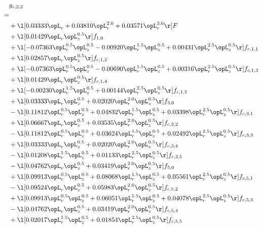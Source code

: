 \begin{alignat}{2} 
\label{eq:g_22_0} 
& g_{c,2,2} \nonumber \\ 
 = \\ 
& + \l[  0.03333 \opL_r +  0.03810 \opL_r^{2.0} +  0.03571 \opL_r^{3.0}  \r] F \nonumber \\ 
& + \l[  0.01429 \opL_r \opL_z^{0.5}  \r] f_{1,0} \nonumber \\ 
& + \l[  -0.07363 \opL_r^{0.5} \opL_z^{0.5}   -0.00920 \opL_r^{1.5} \opL_z^{0.5} +  0.00431 \opL_r^{2.5} \opL_z^{0.5}  \r] f_{c,1,1} \nonumber \\ 
& + \l[  0.02857 \opL_r \opL_z^{0.5}  \r] f_{c,1,2} \nonumber \\ 
& + \l[  -0.07363 \opL_r^{0.5} \opL_z^{0.5}   -0.00690 \opL_r^{1.5} \opL_z^{0.5} +  0.00316 \opL_r^{2.5} \opL_z^{0.5}  \r] f_{c,1,3} \nonumber \\ 
& + \l[  0.01429 \opL_r \opL_z^{0.5}  \r] f_{c,1,4} \nonumber \\ 
& + \l[  -0.00230 \opL_r^{1.5} \opL_z^{0.5} +  0.00144 \opL_r^{2.5} \opL_z^{0.5}  \r] f_{c,1,5} \nonumber \\ 
& + \l[  0.03333 \opL_r \opL_z^{0.5} +  0.02020 \opL_r^{2.0} \opL_z^{0.5}  \r] f_{3,0} \nonumber \\ 
& - \l[  0.11812 \opL_r^{0.5} \opL_z^{0.5} +  0.04832 \opL_r^{1.5} \opL_z^{0.5} +  0.03398 \opL_r^{2.5} \opL_z^{0.5}  \r] f_{c,3,1} \nonumber \\ 
& + \l[  0.06667 \opL_r \opL_z^{0.5} +  0.03535 \opL_r^{2.0} \opL_z^{0.5}  \r] f_{c,3,2} \nonumber \\ 
& - \l[  0.11812 \opL_r^{0.5} \opL_z^{0.5} +  0.03624 \opL_r^{1.5} \opL_z^{0.5} +  0.02492 \opL_r^{2.5} \opL_z^{0.5}  \r] f_{c,3,3} \nonumber \\ 
& + \l[  0.03333 \opL_r \opL_z^{0.5} +  0.02020 \opL_r^{2.0} \opL_z^{0.5}  \r] f_{c,3,4} \nonumber \\ 
& - \l[  0.01208 \opL_r^{1.5} \opL_z^{0.5} +  0.01133 \opL_r^{2.5} \opL_z^{0.5}  \r] f_{c,3,5} \nonumber \\ 
& - \l[  0.04762 \opL_r \opL_z^{0.5} +  0.03419 \opL_r^{2.0} \opL_z^{0.5}  \r] f_{5,0} \nonumber \\ 
& + \l[  0.09913 \opL_r^{0.5} \opL_z^{0.5} +  0.08068 \opL_r^{1.5} \opL_z^{0.5} +  0.05561 \opL_r^{2.5} \opL_z^{0.5}  \r] f_{c,5,1} \nonumber \\ 
& - \l[  0.09524 \opL_r \opL_z^{0.5} +  0.05983 \opL_r^{2.0} \opL_z^{0.5}  \r] f_{c,5,2} \nonumber \\ 
& + \l[  0.09913 \opL_r^{0.5} \opL_z^{0.5} +  0.06051 \opL_r^{1.5} \opL_z^{0.5} +  0.04078 \opL_r^{2.5} \opL_z^{0.5}  \r] f_{c,5,3} \nonumber \\ 
& - \l[  0.04762 \opL_r \opL_z^{0.5} +  0.03419 \opL_r^{2.0} \opL_z^{0.5}  \r] f_{c,5,4} \nonumber \\ 
& + \l[  0.02017 \opL_r^{1.5} \opL_z^{0.5} +  0.01854 \opL_r^{2.5} \opL_z^{0.5}  \r] f_{c,5,5} \nonumber \\ 
\end{alignat} 


